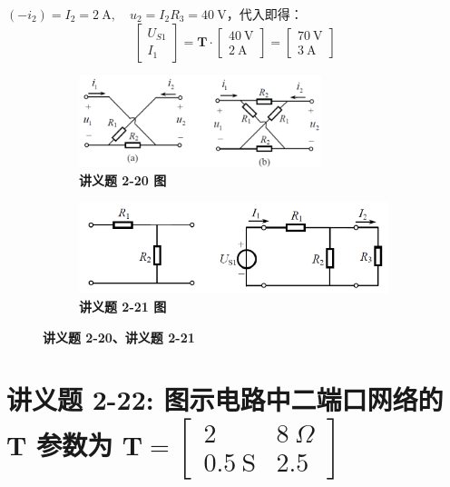 \documentclass[UTF8]{report}
\theoremstyle{MyLineTheoremStyle} %
\theoremstyle{MyBlockTheoremStyle} %
\theoremstyle{MySubsubsectionStyle} %
\begin{document}
$(-i_2) = I_2 = 2\ \mathrm{A},\quad u_2 = I_2R_3 = 40\ \mathrm{V}$，代入即得：
\begin{equation}
\begin{bmatrix}
    U_{S1} \\ 
    I_1
\end{bmatrix}
= 
\boldsymbol{T}\cdot 
\begin{bmatrix}
    40\ \mathrm{V} \\ 
    2 \ \mathrm{A}
\end{bmatrix}
= 
\begin{bmatrix}
    70\ \mathrm{V} \\ 
    3 \ \mathrm{A}
\end{bmatrix}
\end{equation}

\begin{figure}[H]\centering
\begin{subfigure}[t]{0.4\columnwidth}\centering
    \includegraphics[height=76pt]{assets/4/ffe92b96174b737b0ba9725eef3dd53e.png}
    \caption{\bfseries 讲义题 2-20 图 }
\end{subfigure}\begin{subfigure}[t]{0.6\columnwidth}\centering
    \includegraphics[height=76pt]{assets/4/a3822dcee8e6253ad95a943b6b83e06e.png}
    \caption{\bfseries 讲义题 2-21 图 }
\end{subfigure}
\caption{\bfseries 讲义题 2-20、讲义题 2-21 }\label{求G参数}
\end{figure}

\section{讲义题 2-22: 图示电路中二端口网络的 $\boldsymbol{T}$ 参数为 $\boldsymbol{T} = \begin{bmatrix} 2 & 8\  \Omega \\ 0.5\ \mathrm{S} & 2.5 \end{bmatrix} $}
\end{document}

